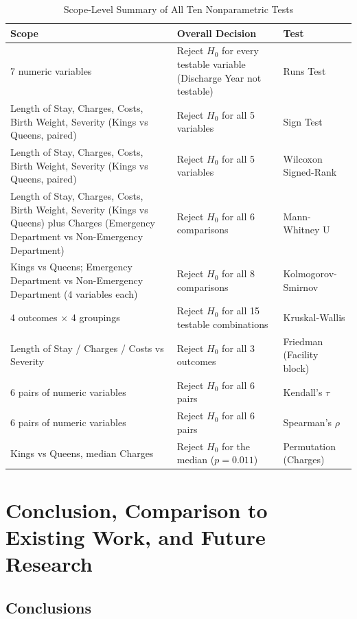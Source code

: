\documentclass[12pt]{article}
\begin{document}
\begin{table}[H]
\centering
\caption{Scope-Level Summary of All Ten Nonparametric Tests}
\label{tab:summary-scope}
\begin{tabular}{p{} p{} p{}}
\toprule
\textbf{Scope} & \textbf{Overall Decision} & \textbf{Test} \\
\midrule
7 numeric variables & Reject $H_0$ for every testable variable (Discharge Year not testable) & Runs Test \\
Length of Stay, Charges, Costs, Birth Weight, Severity (Kings vs Queens, paired) & Reject $H_0$ for all 5 variables & Sign Test \\
Length of Stay, Charges, Costs, Birth Weight, Severity (Kings vs Queens, paired) & Reject $H_0$ for all 5 variables & Wilcoxon Signed-Rank \\
Length of Stay, Charges, Costs, Birth Weight, Severity (Kings vs Queens) plus Charges (Emergency Department vs Non-Emergency Department) & Reject $H_0$ for all 6 comparisons & Mann-Whitney U \\
Kings vs Queens; Emergency Department vs Non-Emergency Department (4 variables each) & Reject $H_0$ for all 8 comparisons & Kolmogorov-Smirnov \\
4 outcomes $\times$ 4 groupings & Reject $H_0$ for all 15 testable combinations & Kruskal-Wallis \\
Length of Stay / Charges / Costs vs Severity & Reject $H_0$ for all 3 outcomes & Friedman (Facility block) \\
6 pairs of numeric variables & Reject $H_0$ for all 6 pairs & Kendall's $\tau$ \\
6 pairs of numeric variables & Reject $H_0$ for all 6 pairs & Spearman's $\rho$ \\
Kings vs Queens, median Charges & Reject $H_0$ for the median ($p=0.011$) & Permutation (Charges) \\
\bottomrule
\end{tabular}
\end{table}

\section{Conclusion, Comparison to Existing Work, and Future Research}

\subsection{Conclusions}
\end{document}
